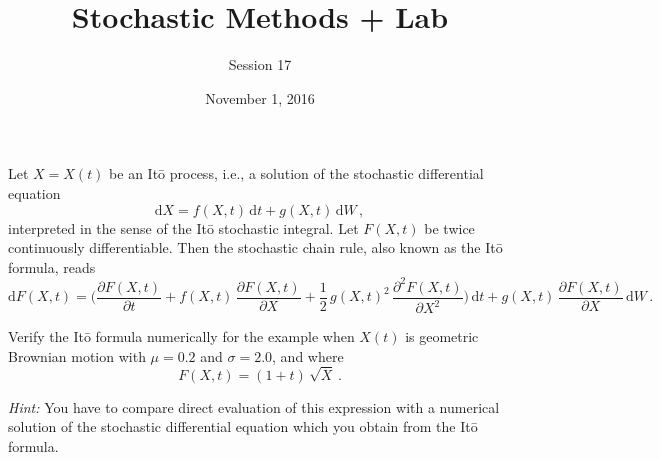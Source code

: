 \documentclass[12pt]{article}
\begin{document}
\title{Stochastic Methods + Lab}
\author{Session 17}
\date{November 1, 2016}
\maketitle

\def\e{\mathrm e}
\def\d{\mathrm d}


Let $X=X(t)$ be an It\=o process, i.e., a solution of the
stochastic differential equation
\[
  \d X = f(X,t) \, \d t + g(X,t) \, \d W \,,
\]
interpreted in the sense of the It\=o stochastic integral.  Let
$F(X,t)$ be twice continuously differentiable.
Then the stochastic chain rule, also known as the It\=o formula, reads
\[
  \d F(X,t)
  = \biggl(
      \frac{\partial F(X,t)}{\partial t}
      + f(X,t) \, \frac{\partial F(X,t)}{\partial X}
      + \frac12 \, g(X,t)^2 \, \frac{\partial^2 F(X,t)}{\partial X^2}
    \biggr) \, \d t
  + g(X,t) \, \frac{\partial F(X,t)}{\partial X} \, \d W \,.
\]

Verify the It\=o formula numerically for the example when $X(t)$ is
geometric Brownian motion with $\mu = 0.2$ and $\sigma=2.0$, and where
\[
  F(X,t) = (1+t) \, \sqrt X \,.
\]

\emph{Hint:} You have to compare direct evaluation of this expression
with a numerical solution of the stochastic differential equation
which you obtain from the It\=o formula.
\end{document}
